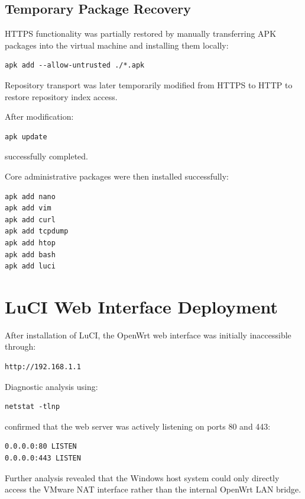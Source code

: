 \documentclass[conference]{IEEEtran}
\begin{document}
\subsection{Temporary Package Recovery}

HTTPS functionality was partially restored by manually transferring APK packages into the virtual machine and installing them locally:

\begin{verbatim}
apk add --allow-untrusted ./*.apk
\end{verbatim}

Repository transport was later temporarily modified from HTTPS to HTTP to restore repository index access.

After modification:

\begin{verbatim}
apk update
\end{verbatim}

successfully completed.

Core administrative packages were then installed successfully:

\begin{verbatim}
apk add nano
apk add vim
apk add curl
apk add tcpdump
apk add htop
apk add bash
apk add luci
\end{verbatim}

\section{LuCI Web Interface Deployment}

After installation of LuCI, the OpenWrt web interface was initially inaccessible through:

\begin{verbatim}
http://192.168.1.1
\end{verbatim}

Diagnostic analysis using:

\begin{verbatim}
netstat -tlnp
\end{verbatim}

confirmed that the web server was actively listening on ports 80 and 443:

\begin{verbatim}
0.0.0.0:80 LISTEN
0.0.0.0:443 LISTEN
\end{verbatim}

Further analysis revealed that the Windows host system could only directly access the VMware NAT interface rather than the internal OpenWrt LAN bridge.
\end{document}
